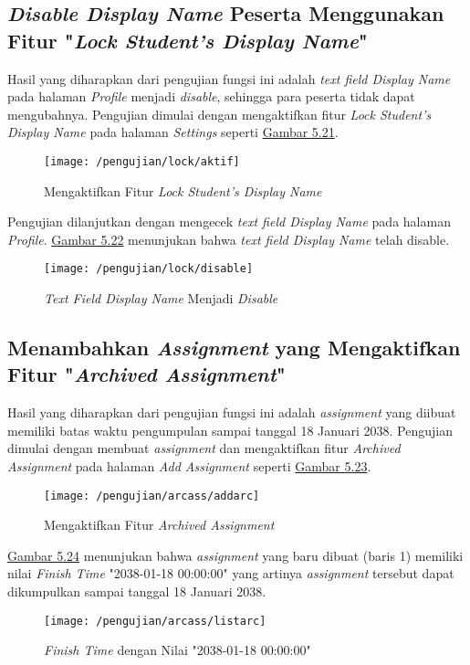 	\subsection{\textit{Disable Display Name} Peserta Menggunakan Fitur "\textit{Lock Student's Display Name}"}
	Hasil yang diharapkan dari pengujian fungsi ini adalah \textit{text field Display Name} pada halaman \textit{Profile} menjadi \textit{disable}, sehingga para peserta tidak dapat mengubahnya. Pengujian dimulai dengan mengaktifkan fitur \textit{Lock Student's Display Name} pada halaman \textit{Settings} seperti \hyperref[fig:dp]{Gambar 5.21}.
	\begin{figure}[H]
		\centering  
		\texttt{[image: /pengujian/lock/aktif]}  
		\caption[Mengaktifkan Fitur \textit{Lock Student's Display Name}]{Mengaktifkan Fitur \textit{Lock Student's Display Name}} 
		\label{fig:aktif} 
	\end{figure}
	
	Pengujian dilanjutkan dengan mengecek \textit{text field Display Name} pada halaman \textit{Profile}. \hyperref[fig:dp]{Gambar 5.22} menunjukan bahwa \textit{text field Display Name} telah disable.
	\begin{figure}[H]
		\centering  
		\texttt{[image: /pengujian/lock/disable]}  
		\caption[\textit{Text Field Display Name} Menjadi \textit{Disable}]{\textit{Text Field Display Name} Menjadi \textit{Disable}} 
		\label{fig:disable} 
	\end{figure}

	\subsection{Menambahkan \textit{Assignment} yang Mengaktifkan Fitur "\textit{Archived Assignment}"}
	Hasil yang diharapkan dari pengujian fungsi ini adalah \textit{\textit{assignment}} yang diibuat memiliki batas waktu pengumpulan sampai tanggal 18 Januari 2038. Pengujian dimulai dengan membuat \textit{assignment} dan mengaktifkan fitur \textit{Archived Assignment} pada halaman \textit{Add Assignment} seperti \hyperref[fig:arc]{Gambar 5.23}.
	\begin{figure}[H]
		\centering  
		\texttt{[image: /pengujian/arcass/addarc]}  
		\caption[Mengaktifkan Fitur \textit{Archived Assignment}]{Mengaktifkan Fitur \textit{Archived Assignment}} 
		\label{fig:arc} 
	\end{figure}
	
	\hyperref[fig:listarc]{Gambar 5.24} menunjukan bahwa \textit{assignment} yang baru dibuat (baris 1) memiliki nilai \textit{Finish Time} "2038-01-18 00:00:00" yang artinya \textit{assignment} tersebut dapat dikumpulkan sampai tanggal 18 Januari 2038.
	\begin{figure}[H]
		\centering  
		\texttt{[image: /pengujian/arcass/listarc]}  
		\caption[\textit{Finish Time} dengan Nilai "2038-01-18 00:00:00"]{\textit{Finish Time} dengan Nilai "2038-01-18 00:00:00"} 
		\label{fig:listarc} 
	\end{figure}

